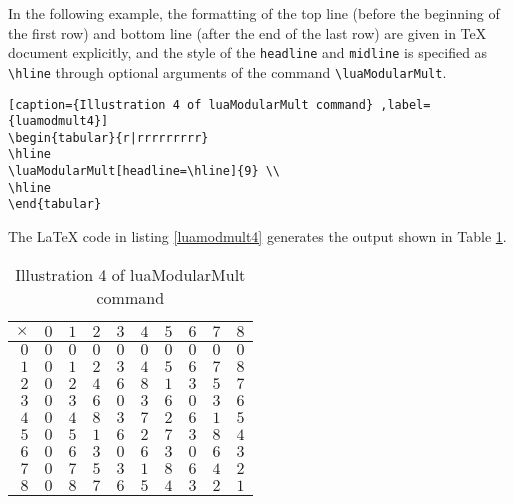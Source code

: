 ﻿\documentclass{article}
\begin{document}
In the following example, the formatting of the top line (before the beginning of the first row) and bottom line (after the end of the last row) are given in TeX document explicitly, and  the style of the \verb|headline| and \verb|midline| is specified as \verb|\hline| through optional arguments of the command \verb|\luaModularMult|.
\begin{lstlisting}[caption={Illustration 4 of luaModularMult command} ,label={luamodmult4}]
\begin{tabular}{r|rrrrrrrrr}
\hline
\luaModularMult[headline=\hline]{9} \\
\hline
\end{tabular}
\end{lstlisting}
The LaTeX code in listing \ref{luamodmult4} generates the output shown in Table  \ref{luamodmult4tbl}.

\begin{table}[H]
\centering
\begin{tabular}{r|rrrrrrrrr}
\hline
$\times$ & $0$ & $1$ & $2$ & $3$ & $4$ & $5$ & $6$ & $7$ & $8$\\ \hline$0$ & $0$ & $0$ & $0$ & $0$ & $0$ & $0$ & $0$ & $0$ & $0$\\ $1$ & $0$ & $1$ & $2$ & $3$ & $4$ & $5$ & $6$ & $7$ & $8$\\ $2$ & $0$ & $2$ & $4$ & $6$ & $8$ & $1$ & $3$ & $5$ & $7$\\ $3$ & $0$ & $3$ & $6$ & $0$ & $3$ & $6$ & $0$ & $3$ & $6$\\ $4$ & $0$ & $4$ & $8$ & $3$ & $7$ & $2$ & $6$ & $1$ & $5$\\ $5$ & $0$ & $5$ & $1$ & $6$ & $2$ & $7$ & $3$ & $8$ & $4$\\ $6$ & $0$ & $6$ & $3$ & $0$ & $6$ & $3$ & $0$ & $6$ & $3$\\ $7$ & $0$ & $7$ & $5$ & $3$ & $1$ & $8$ & $6$ & $4$ & $2$\\ $8$ & $0$ & $8$ & $7$ & $6$ & $5$ & $4$ & $3$ & $2$ & $1$ \\
\hline
\end{tabular} 

\caption{Illustration 4 of luaModularMult command}
\label{luamodmult4tbl}
\end{table}
\end{document}
